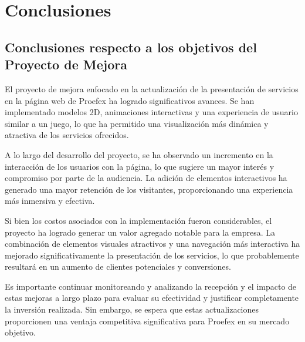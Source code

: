 \titlespacing{\chapter}{0pt}{120pt}{7pt}
\chapter{Conclusiones}
\label{cap:concluciones}

\section{Conclusiones respecto a los objetivos del Proyecto de Mejora}

El proyecto de mejora enfocado en la actualización de la presentación de servicios en la página web de Proefex ha logrado significativos avances. Se han implementado modelos 2D, animaciones interactivas y una experiencia de usuario similar a un juego, lo que ha permitido una visualización más dinámica y atractiva de los servicios ofrecidos.

A lo largo del desarrollo del proyecto, se ha observado un incremento en la interacción de los usuarios con la página, lo que sugiere un mayor interés y compromiso por parte de la audiencia. La adición de elementos interactivos ha generado una mayor retención de los visitantes, proporcionando una experiencia más inmersiva y efectiva.

Si bien los costos asociados con la implementación fueron considerables, el proyecto ha logrado generar un valor agregado notable para la empresa. La combinación de elementos visuales atractivos y una navegación más interactiva ha mejorado significativamente la presentación de los servicios, lo que probablemente resultará en un aumento de clientes potenciales y conversiones.

Es importante continuar monitoreando y analizando la recepción y el impacto de estas mejoras a largo plazo para evaluar su efectividad y justificar completamente la inversión realizada. Sin embargo, se espera que estas actualizaciones proporcionen una ventaja competitiva significativa para Proefex en su mercado objetivo.


